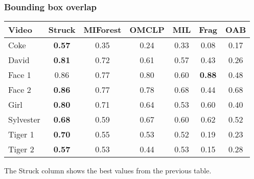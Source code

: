 \documentclass[mathserif,handout]{beamer}
\begin{document}
\begin{frame}
    \frametitle{Bounding box overlap}
    \begin{tabular}{l c c c c c c }
        \toprule
        Video & Struck & MIForest & OMCLP & MIL & Frag & OAB \\
        \midrule
        Coke      & \textbf{0.57} & 0.35 & 0.24 & 0.33 &         0.08  & 0.17 \\
        David     & \textbf{0.81} & 0.72 & 0.61 & 0.57 &         0.43  & 0.26 \\
        Face 1    &         0.86  & 0.77 & 0.80 & 0.60 & \textbf{0.88} & 0.48 \\
        Face 2    & \textbf{0.86} & 0.77 & 0.78 & 0.68 &         0.44  & 0.68 \\
        Girl      & \textbf{0.80} & 0.71 & 0.64 & 0.53 &         0.60  & 0.40 \\
        Sylvester & \textbf{0.68} & 0.59 & 0.67 & 0.60 &         0.62  & 0.52 \\
        Tiger 1   & \textbf{0.70} & 0.55 & 0.53 & 0.52 &         0.19  & 0.23 \\
        Tiger 2   & \textbf{0.57} & 0.53 & 0.44 & 0.53 &         0.15  & 0.28 \\
        \bottomrule
    \end{tabular}

    The Struck column shows the best values from the previous table.
\end{frame}

%
\end{document}
